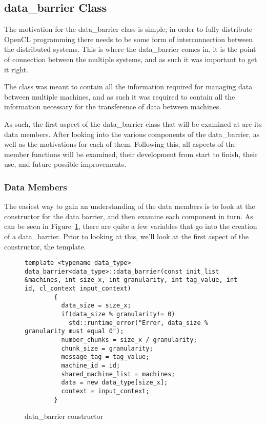 \documentclass[report.tex]{subfiles}
\begin{document}
\subsection{data\_barrier Class} %

The motivation for the data\_barrier class is simple; in order to fully distribute OpenCL programming there needs to be some form of interconnection between the distributed systems. This is where the data\_barrier comes in, it is the point of connection between the multiple systems, and as such it was important to get it right.

The class was meant to contain all the information required for managing data between multiple machines, and as such it was required to contain all the information necessary for the transference of data between machines.

As such, the first aspect of the data\_barrier class that will be examined at are its data members. After looking into the various components of the data\_barrier, as well as the motivations for each of them. Following this, all aspects of the member functions will be examined, their development from start to finish, their use, and future possible improvements.

\subsubsection{Data Members} %
\label{ssub:data_members}
  The easiest way to gain an understanding of the data members is to look at the constructor for the data barrier, and then examine each component in turn. As can be seen in Figure~\ref{fig:data_barrier_constructor}, there are quite a few variables that go into the creation of a data\_barrier. Prior to looking at this, we'll look at the first aspect of the constructor, the template.

  \begin{figure}[htbp]
    \centering

    \lstset{language=cpp}  
    \begin{lstlisting}[tabsize=2]
        template <typename data_type> data_barrier<data_type>::data_barrier(const init_list &machines, int size_x, int granularity, int tag_value, int id, cl_context input_context)
        {
          data_size = size_x;
          if(data_size % granularity!= 0)
            std::runtime_error("Error, data_size % granularity must equal 0");
          number_chunks = size_x / granularity;
          chunk_size = granularity;
          message_tag = tag_value;
          machine_id = id;
          shared_machine_list = machines;
          data = new data_type[size_x];
          context = input_context;
        }

      \end{lstlisting}

    \caption{data\_barrier constructor}
    \label{fig:data_barrier_constructor}
  \end{figure}
   
\end{document}
